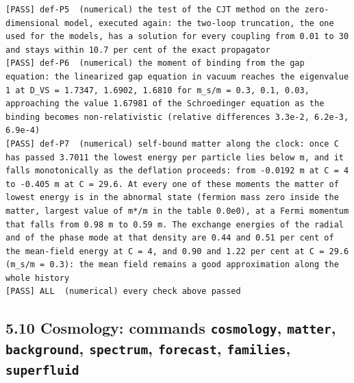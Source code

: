 \documentclass[
  10pt,
]{article}
\begin{document}
\begin{verbatim}
[PASS] def-P5  (numerical) the test of the CJT method on the zero-dimensional model, executed again: the two-loop truncation, the one used for the models, has a solution for every coupling from 0.01 to 30 and stays within 10.7 per cent of the exact propagator
[PASS] def-P6  (numerical) the moment of binding from the gap equation: the linearized gap equation in vacuum reaches the eigenvalue 1 at D_VS = 1.7347, 1.6902, 1.6810 for m_s/m = 0.3, 0.1, 0.03, approaching the value 1.67981 of the Schroedinger equation as the binding becomes non-relativistic (relative differences 3.3e-2, 6.2e-3, 6.9e-4)
[PASS] def-P7  (numerical) self-bound matter along the clock: once C has passed 3.7011 the lowest energy per particle lies below m, and it falls monotonically as the deflation proceeds: from -0.0192 m at C = 4 to -0.405 m at C = 29.6. At every one of these moments the matter of lowest energy is in the abnormal state (fermion mass zero inside the matter, largest value of m*/m in the table 0.0e0), at a Fermi momentum that falls from 0.98 m to 0.59 m. The exchange energies of the radial and of the phase mode at that density are 0.44 and 0.51 per cent of the mean-field energy at C = 4, and 0.90 and 1.22 per cent at C = 29.6 (m_s/m = 0.3): the mean field remains a good approximation along the whole history
[PASS] ALL  (numerical) every check above passed
\end{verbatim}

\hypertarget{cosmology-commands-cosmology-matter-background-spectrum-forecast-families-superfluid}{%
\subsection{\texorpdfstring{5.10 Cosmology: commands \texttt{cosmology},
\texttt{matter}, \texttt{background}, \texttt{spectrum},
\texttt{forecast}, \texttt{families},
\texttt{superfluid}}{5.10 Cosmology: commands cosmology, matter, background, spectrum, forecast, families, superfluid}}\label{cosmology-commands-cosmology-matter-background-spectrum-forecast-families-superfluid}}
\end{document}

